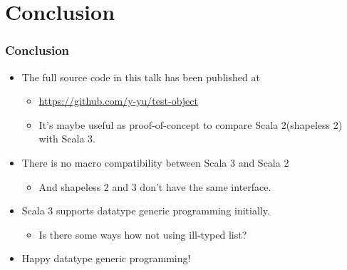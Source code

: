\section{Conclusion}

\begin{frame}
  \frametitle{Conclusion}

  \pause
  \begin{itemize}
    \item The full source code in this talk has been published at 
    \begin{itemize}
      \item \url{https://github.com/y-yu/test-object}
      \item It's maybe useful as proof-of-concept to compare Scala 2(shapeless 2) with Scala 3.
    \end{itemize}

    \item<+-> There is no macro compatibility between Scala 3 and Scala 2 
    \begin{itemize}
      \item And shapeless 2 and 3 don't have the same interface.
    \end{itemize}

    \item Scala 3 supports datatype generic programming initially.
    \begin{itemize}
      \item Is there some ways how not using ill-typed list?
    \end{itemize}

    \item Happy datatype generic programming!
  \end{itemize}

\end{frame}

